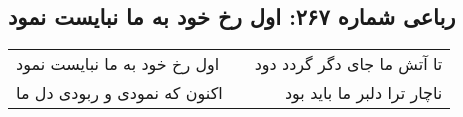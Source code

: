 \begin{center}
\section*{رباعی شماره ۲۶۷: اول رخ خود به ما نبایست نمود}
\label{sec:sh267}
\begin{longtable}{l p{0.5cm} r}
اول رخ خود به ما نبایست نمود
&&
تا آتش ما جای دگر گردد دود
\\
اکنون که نمودی و ربودی دل ما
&&
ناچار ترا دلبر ما باید بود
\\
\end{longtable}
\end{center}
